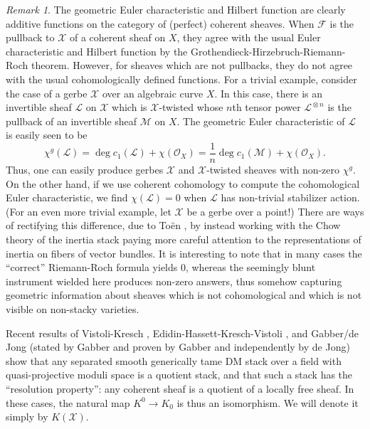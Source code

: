 \documentclass[11pt]{amsart}
\newcommand{\ms}[1]{\mathscr #1}
\renewcommand{\[}{[\!\hspace{0.03em}[}
\renewcommand{\]}{]\!\hspace{0.03em}]}
\renewcommand{\(}{(\!\hspace{0.03em}(}
\renewcommand{\)}{)\!\hspace{0.03em})}
\DeclareMathOperator*{\tensor}{\otimes}
\theoremstyle{definition}
\theoremstyle{remark}
\newtheorem{remark}[lem]{Remark}
\begin{document}
\begin{remark} The geometric Euler characteristic and Hilbert function are clearly 
additive functions on the category of (perfect) coherent 
sheaves.  When $\ms F$ is the pullback to $\ms X$ of a coherent sheaf 
on $X$, they agree with the usual Euler characteristic and Hilbert 
function by the Grothendieck-Hirzebruch-Riemann-Roch theorem.  
However, for sheaves which are not pullbacks, they do not agree with 
the usual cohomologically defined functions.  For a trivial example, 
consider the case of a gerbe $\ms X$ over an algebraic curve $X$.  In this case, there is an invertible sheaf $\ms 
L$ on $\ms X$ which is $\ms X$-twisted whose $n$th tensor power $\ms 
L^{\tensor n}$ is the pullback of an invertible sheaf $\ms M$ on $X$.  
The geometric Euler characteristic of $\ms L$ is easily seen to be 
$$\chi^{g}(\ms L)=\deg c_{1}(\ms L)+\chi({\ms O}_{X})=\frac{1}{n}\deg 
c_{1}(\ms M)+\chi({\ms O}_{X}).$$
Thus, one can easily produce gerbes $\ms X$ and 
$\ms X$-twisted sheaves with non-zero $\chi^{g}$.  On the other hand, 
if we use coherent cohomology to compute the cohomological Euler 
characteristic, we find $\chi(\ms L)=0$ when $\ms L$ has non-trivial 
stabilizer action.  (For an even more trivial example, let $\ms X$ be 
a gerbe over a point!)  There are ways of rectifying this difference, due to To\"en \cite{toen}, by instead working with the Chow theory of the inertia stack paying more careful attention to the representations of inertia on fibers of vector bundles.  It is interesting to note that in many cases the ``correct'' Riemann-Roch formula yields $0$, whereas the seemingly blunt instrument wielded here produces non-zero answers, thus somehow capturing geometric information about sheaves which is not cohomological and which is not visible on non-stacky varieties.
\end{remark}

Recent results of Vistoli-Kresch \cite{vistoli-kresch}, Edidin-Hassett-Kresch-Vistoli 
\cite{vistoli-kresch-etc}, and Gabber/de Jong \cite{dejong-gabber} (stated by Gabber and proven by Gabber 
and independently by de Jong) show that any separated smooth generically tame DM stack over a field with quasi-projective 
moduli space is a quotient stack, 
and that such a stack has the ``resolution property'': any coherent 
sheaf is a quotient of a locally free sheaf.  In these cases, the 
natural map $K^{0}\to K_{0}$ is thus an isomorphism.  We will denote 
it simply by $K(\ms X)$.
\end{document}
